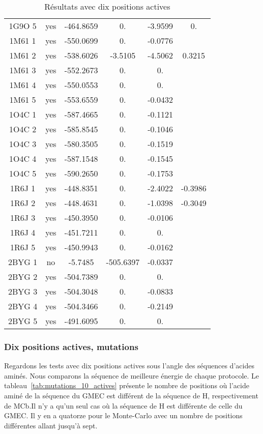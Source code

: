 \begin{table}[h]
{\begin{tabular}{cccccc}
        1G9O 5 & yes & -464.8659 & 0. & -3.9599 & 0.\\
        1M61 1 & yes & -550.0699 & 0. & -0.0776 & \\
        1M61 2 & yes & -538.6026 & -3.5105 & -4.5062 & 0.3215 \\
        1M61 3 & yes & -552.2673 & 0. & 0. & \\
        1M61 4 & yes & -550.0553 & 0. & 0. & \\
        1M61 5 & yes & -553.6559 & 0. & -0.0432 & \\
        1O4C 1 & yes & -587.4665 & 0. & -0.1121 & \\
        1O4C 2 & yes & -585.8545 & 0. & -0.1046 & \\
        1O4C 3 & yes & -580.3505 & 0. & -0.1519 & \\
        1O4C 4 & yes & -587.1548 & 0. & -0.1545 & \\
        1O4C 5 & yes & -590.2650 & 0. & -0.1753 & \\
        1R6J 1 & yes & -448.8351 & 0. & -2.4022 & -0.3986 \\
        1R6J 2 & yes & -448.4631 & 0. & -1.0398 & -0.3049 \\
        1R6J 3 & yes & -450.3950 & 0. & -0.0106 & \\
        1R6J 4 & yes & -451.7211 & 0. & 0. & \\
        1R6J 5 & yes & -450.9943 & 0. & -0.0162 & \\
        2BYG 1 & no  & -5.7485   & -505.6397 & -0.0337 & \\
        2BYG 2 & yes & -504.7389 & 0. & 0. & \\
        2BYG 3 & yes & -504.3048 & 0. & -0.0833 & \\
        2BYG 4 & yes & -504.3466 & 0. & -0.2149 & \\
        2BYG 5 & yes & -491.6095 & 0. & 0. & \\
        
        \bottomrule


 \end{tabular}  
}    
 \caption{Résultats avec dix positions actives }
\label{tab:result_10_actives}
\end{table}

   \subsubsection{Dix positions actives, mutations}

Regardons les tests avec dix positions actives sous l'angle des séquences d'acides aminés. Nous comparons la séquence de meilleure énergie de chaque protocole. Le tableau~\ref{tab:mutations_10_actives} présente le nombre de positions où l'acide aminé de la séquence du GMEC est différent de la séquence de H, respectivement de MCb.Il n'y a qu'un seul cas où  la séquence de H est différente de celle du GMEC.
Il y en a quatorze pour le Monte-Carlo avec un nombre de positions différentes allant jusqu'à sept.

